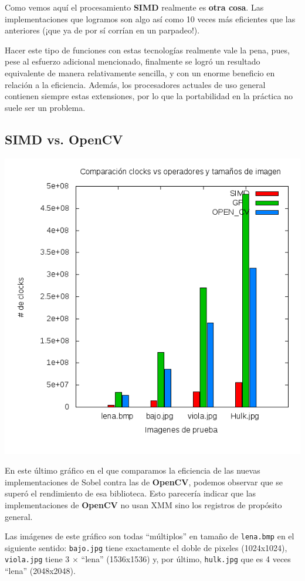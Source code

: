 Como vemos aquí el procesamiento \textbf{SIMD} realmente es \textbf{otra cosa}.
Las implementaciones que logramos son algo así como 10 veces más eficientes que
las anteriores (¡que ya de por sí corrían en un parpadeo!).

Hacer este tipo de funciones con estas tecnologías realmente vale la pena, pues,
pese al esfuerzo adicional mencionado, finalmente se logró un resultado equivalente
de manera relativamente sencilla, y con un enorme beneficio en relación a la eficiencia.
Además, los procesadores actuales de uso general contienen siempre estas extensiones,
por lo que la portabilidad en la práctica no suele ser un problema.

\pagebreak
\subsection{SIMD vs. OpenCV}

\includegraphics[scale=0.5]{../resultados/graf3.png}

En este último gráfico en el que comparamos la eficiencia de las nuevas implementaciones
de Sobel contra las de \textbf{OpenCV}, podemos observar que se superó el rendimiento de esa
biblioteca. Esto parecería indicar que las implementaciones de \textbf{OpenCV} no usan
XMM sino los registros de propósito general.

Las imágenes de este gráfico son todas ``múltiplos'' en tamaño de \texttt{lena.bmp} en el siguiente sentido: \texttt{bajo.jpg} tiene exactamente el doble de pixeles (1024x1024), \texttt{viola.jpg} tiene 3 $\times$ ``lena'' (1536x1536) y, por último, \texttt{hulk.jpg} que es 4 veces ``lena'' (2048x2048). 




